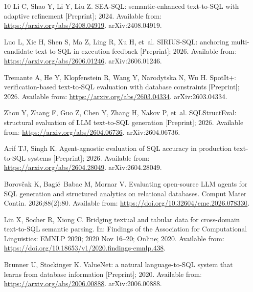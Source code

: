 \begin{thebibliography}{10}
Li C, Shao Y, Li Y, Liu Z.
\newblock SEA-SQL: semantic-enhanced text-to-SQL with adaptive refinement
  [Preprint]; 2024.
\newblock Available from: \url{https://arxiv.org/abs/2408.04919}.
\newblock arXiv:2408.04919.

Luo L, Xie H, Shen S, Ma Z, Ling R, Xu H, et~al.
\newblock SIRIUS-SQL: anchoring multi-candidate text-to-SQL in execution
  feedback [Preprint]; 2026.
\newblock Available from: \url{https://arxiv.org/abs/2606.01246}.
\newblock arXiv:2606.01246.

Tremante A, He Y, Klopfenstein R, Wang Y, Narodytska N, Wu H.
\newblock SpotIt+: verification-based text-to-SQL evaluation with database
  constraints [Preprint]; 2026.
\newblock Available from: \url{https://arxiv.org/abs/2603.04334}.
\newblock arXiv:2603.04334.

Zhou Y, Zhang F, Guo Z, Chen Y, Zhang H, Nakov P, et~al.
\newblock SQLStructEval: structural evaluation of LLM text-to-SQL generation
  [Preprint]; 2026.
\newblock Available from: \url{https://arxiv.org/abs/2604.06736}.
\newblock arXiv:2604.06736.

Arif TJ, Singh K.
\newblock Agent-agnostic evaluation of SQL accuracy in production text-to-SQL
  systems [Preprint]; 2026.
\newblock Available from: \url{https://arxiv.org/abs/2604.28049}.
\newblock arXiv:2604.28049.

Borov{\v{c}}ak K, Bagi{\'{c}}~Babac M, Mornar V.
\newblock Evaluating open-source LLM agents for SQL generation and structured
  analytics on relational databases.
\newblock Comput Mater Contin. 2026;88(2):80.
\newblock Available from: \url{https://doi.org/10.32604/cmc.2026.078330}.

Lin X, Socher R, Xiong C.
\newblock Bridging textual and tabular data for cross-domain text-to-SQL
  semantic parsing.
\newblock In: Findings of the Association for Computational Linguistics: EMNLP
  2020; 2020 Nov 16--20; Online; 2020. Available from:
  \url{https://doi.org/10.18653/v1/2020.findings-emnlp.438}.

Brunner U, Stockinger K.
\newblock ValueNet: a natural language-to-SQL system that learns from database
  information [Preprint]; 2020.
\newblock Available from: \url{https://arxiv.org/abs/2006.00888}.
\newblock arXiv:2006.00888.

\end{thebibliography}
